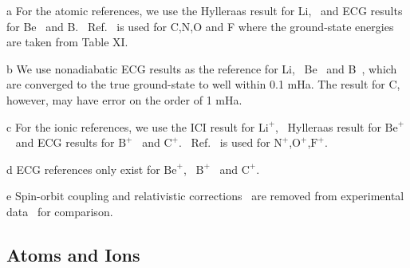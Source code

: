\documentclass[aip,jcp,numerical,reprint]{revtex4-1}
\begin{document}
\begin{table}[t!]
\begin{threeparttable}
\begin{tablenotes}
\item[a] For the atomic references, we use the Hylleraas result for Li,~\cite{Wang_Li} and ECG results for Be~\cite{Stanke_Be} and B.~\cite{Bubin_B} Ref.~\cite{Davidson_Atoms} is used for C,N,O and F where the ground-state energies are taken from Table XI.
\item[b] We use nonadiabatic ECG results as the reference for Li,~\cite{Stanke_Li} Be~\cite{Bubin_BeH_noBO} and B~\cite{Bubin_B}, which are converged to the true ground-state to well within 0.1 mHa. The result for C,~\cite{Bubin_C} however, may have error on the order of 1 mHa.
\item[c] For the ionic references, we use the ICI result for $\text{Li}^+$,~\cite{Nakashima_Li+} Hylleraas result for $\text{Be}^+$~\cite{Puchalski_Be+} and ECG results for $\text{B}^+$~\cite{Bubin_B+} and $\text{C}^+$.~\cite{Bubin_C+,mitroy2013} Ref.~\cite{Davidson_Atoms} is used for $\text{N}^+$,$\text{O}^+$,$\text{F}^+$.
\item[d] ECG references only exist for $\text{Be}^+$,~\cite{Bubin_BeH_noBO} $\text{B}^+$~\cite{Bubin_B+} and $\text{C}^+$.~\cite{Bubin_C+}
\item[e] Spin-orbit coupling and relativistic corrections~\cite{Klopper_IP} are removed from experimental data~\cite{NIST_Atoms} for comparison.
\end{tablenotes}

\end{threeparttable}
\end{table}

\subsection{Atoms and Ions}
\end{document}
